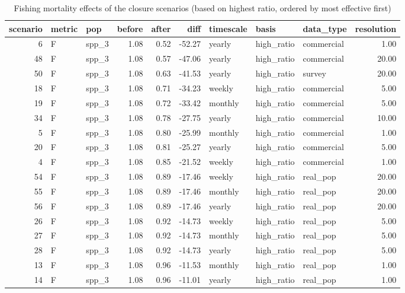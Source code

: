\begin{longtable}{rllrrrlllr}
\caption{Fishing mortality effects of the
     closure scenarios (based on highest ratio, ordered by most
effective first)} \\ 
  \hline
scenario & metric & pop & before & after & diff & timescale & basis & data\_type & resolution \\ 
  \hline
  6 & F & spp\_3 & 1.08 & 0.52 & -52.27 & yearly & high\_ratio & commercial & 1.00 \\ 
   48 & F & spp\_3 & 1.08 & 0.57 & -47.06 & yearly & high\_ratio & commercial & 20.00 \\ 
   50 & F & spp\_3 & 1.08 & 0.63 & -41.53 & yearly & high\_ratio & survey & 20.00 \\ 
   18 & F & spp\_3 & 1.08 & 0.71 & -34.23 & weekly & high\_ratio & commercial & 5.00 \\ 
   19 & F & spp\_3 & 1.08 & 0.72 & -33.42 & monthly & high\_ratio & commercial & 5.00 \\ 
   34 & F & spp\_3 & 1.08 & 0.78 & -27.75 & yearly & high\_ratio & commercial & 10.00 \\ 
    5 & F & spp\_3 & 1.08 & 0.80 & -25.99 & monthly & high\_ratio & commercial & 1.00 \\ 
   20 & F & spp\_3 & 1.08 & 0.81 & -25.27 & yearly & high\_ratio & commercial & 5.00 \\ 
    4 & F & spp\_3 & 1.08 & 0.85 & -21.52 & weekly & high\_ratio & commercial & 1.00 \\ 
   54 & F & spp\_3 & 1.08 & 0.89 & -17.46 & weekly & high\_ratio & real\_pop & 20.00 \\ 
   55 & F & spp\_3 & 1.08 & 0.89 & -17.46 & monthly & high\_ratio & real\_pop & 20.00 \\ 
   56 & F & spp\_3 & 1.08 & 0.89 & -17.46 & yearly & high\_ratio & real\_pop & 20.00 \\ 
   26 & F & spp\_3 & 1.08 & 0.92 & -14.73 & weekly & high\_ratio & real\_pop & 5.00 \\ 
   27 & F & spp\_3 & 1.08 & 0.92 & -14.73 & monthly & high\_ratio & real\_pop & 5.00 \\ 
   28 & F & spp\_3 & 1.08 & 0.92 & -14.73 & yearly & high\_ratio & real\_pop & 5.00 \\ 
   13 & F & spp\_3 & 1.08 & 0.96 & -11.53 & monthly & high\_ratio & real\_pop & 1.00 \\ 
   14 & F & spp\_3 & 1.08 & 0.96 & -11.01 & yearly & high\_ratio & real\_pop & 1.00 \\ 

\end{longtable}
